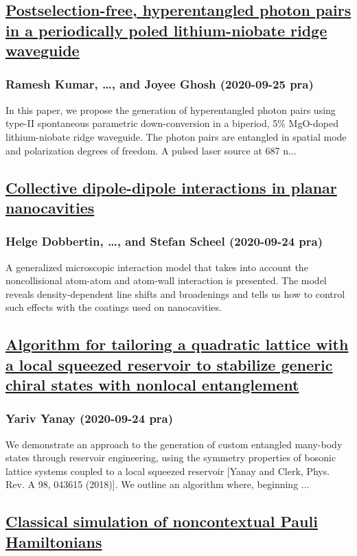 \subsection*{\href{http://link.aps.org/doi/10.1103/PhysRevA.102.033722}{Postselection-free, hyperentangled photon pairs in a periodically poled lithium-niobate ridge waveguide}}
\subsubsection*{Ramesh Kumar, \dots, and Joyee Ghosh (2020-09-25 pra)}
In this paper, we propose the generation of hyperentangled photon pairs using type-II spontaneous parametric down-conversion in a biperiod, 5\% MgO-doped lithium-niobate ridge waveguide. The photon pairs are entangled in spatial mode and polarization degrees of freedom. A pulsed laser source at 687 n...
\subsection*{\href{http://link.aps.org/doi/10.1103/PhysRevA.102.031701}{Collective dipole-dipole interactions in planar nanocavities}}
\subsubsection*{Helge Dobbertin, \dots, and Stefan Scheel (2020-09-24 pra)}
A generalized microscopic interaction model that takes into account the noncollisional atom-atom and atom-wall interaction is presented. The model reveals density-dependent line shifts and broadenings and tells us how to control such effects with the coatings used on nanocavities.
\subsection*{\href{http://link.aps.org/doi/10.1103/PhysRevA.102.032417}{Algorithm for tailoring a quadratic lattice with a local squeezed reservoir to stabilize generic chiral states with nonlocal entanglement}}
\subsubsection*{Yariv Yanay (2020-09-24 pra)}
We demonstrate an approach to the generation of custom entangled many-body states through reservoir engineering, using the symmetry properties of bosonic lattice systems coupled to a local squeezed reservoir [Yanay and Clerk, Phys. Rev. A 98, 043615 (2018)]. We outline an algorithm where, beginning ...
\subsection*{\href{http://link.aps.org/doi/10.1103/PhysRevA.102.032418}{Classical simulation of noncontextual Pauli Hamiltonians}}
